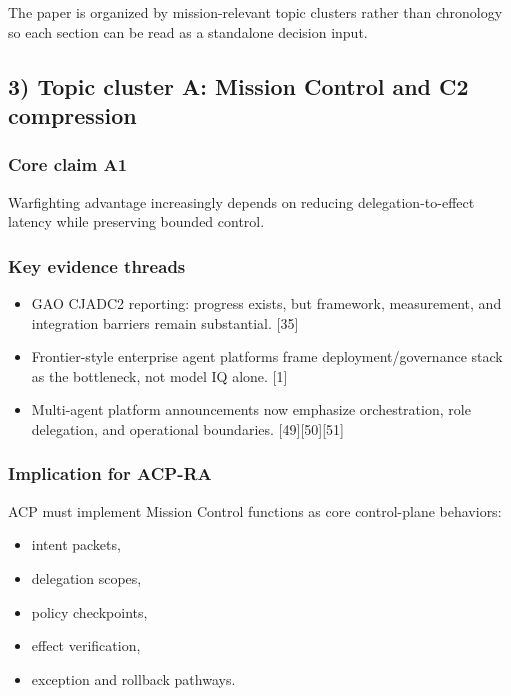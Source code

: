 \documentclass[11pt]{article}
\begin{document}
The paper is organized by mission-relevant topic clusters rather than
chronology so each section can be read as a standalone decision input.

\hypertarget{topic-cluster-a-mission-control-and-c2-compression}{%
\subsection{3) Topic cluster A: Mission Control and C2
compression}\label{topic-cluster-a-mission-control-and-c2-compression}}

\hypertarget{core-claim-a1}{%
\subsubsection{Core claim A1}\label{core-claim-a1}}

Warfighting advantage increasingly depends on reducing
delegation-to-effect latency while preserving bounded control.

\hypertarget{key-evidence-threads}{%
\subsubsection{Key evidence threads}\label{key-evidence-threads}}

\begin{itemize}
\tightlist
\item
  GAO CJADC2 reporting: progress exists, but framework, measurement, and
  integration barriers remain substantial. {[}35{]}
\item
  Frontier-style enterprise agent platforms frame deployment/governance
  stack as the bottleneck, not model IQ alone. {[}1{]}
\item
  Multi-agent platform announcements now emphasize orchestration, role
  delegation, and operational boundaries. {[}49{]}{[}50{]}{[}51{]}
\end{itemize}

\hypertarget{implication-for-acp-ra}{%
\subsubsection{Implication for ACP-RA}\label{implication-for-acp-ra}}

ACP must implement Mission Control functions as core control-plane
behaviors:

\begin{itemize}
\tightlist
\item
  intent packets,
\item
  delegation scopes,
\item
  policy checkpoints,
\item
  effect verification,
\item
  exception and rollback pathways.
\end{itemize}
\end{document}

